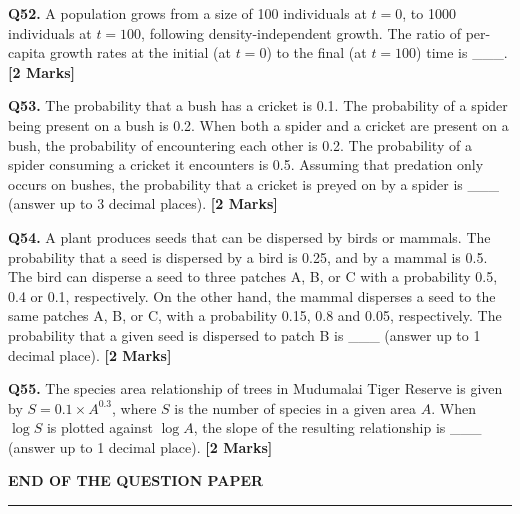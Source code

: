 \documentclass[11pt]{article}
\newcommand{\questionb}[2]{
    \noindent\textbf{Q#2.} #1 \hfill \textbf{[2 Marks]}
}
\begin{document}
\questionb{A population grows from a size of 100 individuals at \(t = 0\), to 1000 individuals at \(t = 100\), following density-independent growth. The ratio of per-capita growth rates at the initial (at \(t = 0\)) to the final (at \(t = 100\)) time is \_\_\_.}{52}
\vspace{0.5cm}

\questionb{The probability that a bush has a cricket is 0.1. The probability of a spider being present on a bush is 0.2. When both a spider and a cricket are present on a bush, the probability of encountering each other is 0.2. The probability of a spider consuming a cricket it encounters is 0.5. Assuming that predation only occurs on bushes, the probability that a cricket is preyed on by a spider is \_\_\_ (answer up to 3 decimal places).}{53}
\vspace{0.5cm}

\questionb{A plant produces seeds that can be dispersed by birds or mammals. The probability that a seed is dispersed by a bird is 0.25, and by a mammal is 0.5. The bird can disperse a seed to three patches A, B, or C with a probability 0.5, 0.4 or 0.1, respectively. On the other hand, the mammal disperses a seed to the same patches A, B, or C, with a probability 0.15, 0.8 and 0.05, respectively. The probability that a given seed is dispersed to patch B is \_\_\_ (answer up to 1 decimal place).}{54}
\vspace{0.5cm}

\questionb{The species area relationship of trees in Mudumalai Tiger Reserve is given by \(S = 0.1 \times A^{0.3}\), where \(S\) is the number of species in a given area \(A\). When \(\log S\) is plotted against \(\log A\), the slope of the resulting relationship is \_\_\_ (answer up to 1 decimal place).}{55}
\vspace{0.5cm}

\vspace{5cm}
\begin{center}
\textbf{END OF THE QUESTION PAPER}\\
\rule{\textwidth}{0.5pt}
\end{center}
\end{document}

